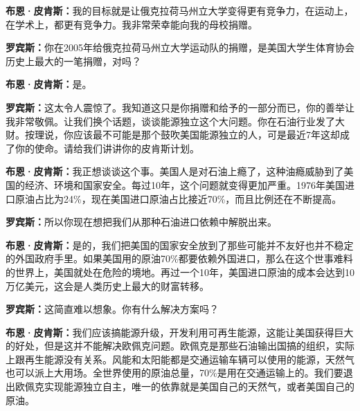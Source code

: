 \begin{BookQuote}
\textbf{布恩·皮肯斯：}我的目标就是让俄克拉荷马州立大学变得更有竞争力，在运动上，在学术上，都更有竞争力。我非常荣幸能向我的母校捐赠。
\end{BookQuote}

\begin{BookQuote}
\textbf{罗宾斯：}你在2005年给俄克拉荷马州立大学运动队的捐赠，是美国大学生体育协会历史上最大的一笔捐赠，对吗？
\end{BookQuote}

\begin{BookQuote}
\textbf{布恩·皮肯斯：}是。
\end{BookQuote}

\begin{BookQuote}
\textbf{罗宾斯：}这太令人震惊了。我知道这只是你捐赠和给予的一部分而已，你的善举让我非常敬佩。让我们换个话题，谈谈能源独立这个大问题。你在石油行业发了大财。按理说，你应该最不可能是那个鼓吹美国能源独立的人，可是最近7年这却成了你的使命。请给我们讲讲你的皮肯斯计划。
\end{BookQuote}

\begin{BookQuote}
\textbf{布恩·皮肯斯：}我正想谈谈这个事。美国人是对石油上瘾了，这种油瘾威胁到了美国的经济、环境和国家安全。每过10年，这个问题就变得更加严重。1976年美国进口原油占比为24\%，现在美国进口原油占比接近70\%，而且比例还在不断提高。
\end{BookQuote}

\begin{BookQuote}
\textbf{罗宾斯：}所以你现在想把我们从那种石油进口依赖中解脱出来。
\end{BookQuote}

\begin{BookQuote}
\textbf{布恩·皮肯斯：}是的，我们把美国的国家安全放到了那些可能并不友好也并不稳定的外国政府手里。如果美国用的原油70\%都要依赖外国进口，那么在这个世事难料的世界上，美国就处在危险的境地。再过一个10年，美国进口原油的成本会达到10万亿美元，这会是人类历史上最大的财富转移。
\end{BookQuote}

\begin{BookQuote}
\textbf{罗宾斯：}这简直难以想象。你有什么解决方案吗？
\end{BookQuote}

\begin{BookQuote}
\textbf{布恩·皮肯斯：}我们应该搞能源升级，开发利用可再生能源，这能让美国获得巨大的好处，但是这并不能解决欧佩克问题。欧佩克是那些石油输出国搞的组织，实际上跟再生能源没有关系。风能和太阳能都是交通运输车辆可以使用的能源，天然气也可以派上大用场。全世界使用的原油总量，70\%是用在交通运输上的。我们要退出欧佩克实现能源独立自主，唯一的依靠就是美国自己的天然气，或者美国自己的原油。
\end{BookQuote}

